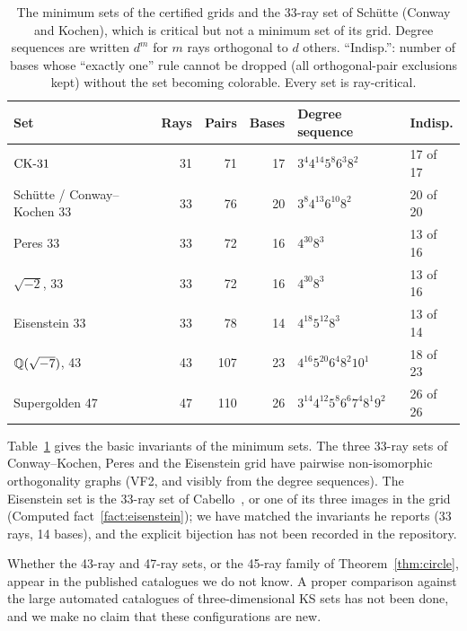 \begin{table}[t]
\centering
\caption{The minimum sets of the certified grids and the 33-ray set of Sch\"utte (Conway
and Kochen), which is critical but not a minimum set of its grid.  Degree sequences are written
$d^{m}$ for $m$ rays orthogonal to $d$ others.  ``Indisp.'': number of bases whose ``exactly
one'' rule cannot be dropped (all orthogonal-pair exclusions kept) without the set becoming
colorable.  Every set is ray-critical.}
\label{tab:profiles}
\small
\begin{tabular}{lrrrll}
\toprule
Set & Rays & Pairs & Bases & Degree sequence & Indisp. \\
\midrule
$\mathrm{CK}\text{-}31$ & 31 & 71 & 17 & $3^{4}4^{14}5^{8}6^{3}8^{2}$ & 17 of 17 \\
Sch\"utte / Conway--Kochen 33 & 33 & 76 & 20 & $3^{8}4^{13}6^{10}8^{2}$ & 20 of 20 \\
Peres 33 & 33 & 72 & 16 & $4^{30}8^{3}$ & 13 of 16 \\
$\sqrt{-2}$, 33 & 33 & 72 & 16 & $4^{30}8^{3}$ & 13 of 16 \\
Eisenstein 33 & 33 & 78 & 14 & $4^{18}5^{12}8^{3}$ & 13 of 14 \\
$\mathbb{Q}(\sqrt{-7})$, 43 & 43 & 107 & 23 & $4^{16}5^{20}6^{4}8^{2}10^{1}$ & 18 of 23 \\
Supergolden 47 & 47 & 110 & 26 & $3^{14}4^{12}5^{8}6^{6}7^{4}8^{1}9^{2}$ & 26 of 26 \\
\bottomrule
\end{tabular}
\end{table}

Table~\ref{tab:profiles} gives the basic invariants of the minimum sets.  The three 33-ray sets
of Conway--Kochen, Peres and the Eisenstein grid have pairwise non-isomorphic orthogonality
graphs (VF2, and visibly from the degree sequences).  The Eisenstein set is the 33-ray set of
Cabello~\cite{Cabello2025simplest}, or one of its three images in the grid
(Computed fact~\ref{fact:eisenstein}); we have matched the invariants he reports (33 rays, 14
bases), and the explicit bijection has not been recorded in the repository.

Whether the 43-ray and 47-ray sets, or the 45-ray family of Theorem~\ref{thm:circle}, appear in
the published catalogues we do not know.  A proper comparison against the large automated
catalogues of three-dimensional KS sets has not been done, and we make no claim that these
configurations are new.
